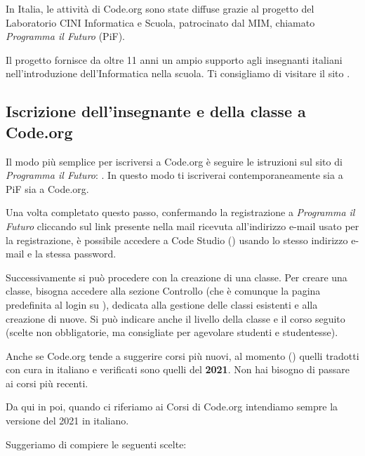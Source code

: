 In Italia, le attività di Code.org sono state diffuse grazie al progetto del Laboratorio CINI Informatica e Scuola, patrocinato dal MIM, chiamato \emph{Programma il Futuro} (PiF).

Il progetto fornisce da oltre 11 anni un ampio supporto agli insegnanti italiani nell'introduzione dell'Informatica nella scuola. Ti consigliamo di visitare il sito .

\subsection{Iscrizione dell'insegnante e della classe a Code.org }\label{iscrizione-dellinsegnante-e-della-classe-a-code.org}


Il modo più semplice per iscriversi a Code.org è seguire le istruzioni sul sito di \emph{Programma il Futuro}: . In questo modo ti iscriverai contemporaneamente sia a PiF sia a Code.org.


Una volta completato questo passo, confermando la registrazione a \emph{Programma il Futuro} cliccando sul link presente nella mail ricevuta all'indirizzo e-mail usato per la registrazione, è possibile accedere a Code Studio () usando lo stesso indirizzo e-mail e la stessa password.

Successivamente si può procedere con la creazione di una classe. Per creare una classe, bisogna accedere alla sezione Controllo (che è comunque la pagina predefinita al login su ), dedicata alla gestione delle classi esistenti e alla creazione di nuove. Si può indicare anche il livello della classe e il corso seguito (scelte non obbligatorie, ma consigliate per agevolare studenti e studentesse).

\begin{attenzione}
  Anche se Code.org tende a suggerire corsi più nuovi, al momento (\meseannocorrente) quelli tradotti con cura in italiano e verificati sono quelli del \textbf{2021}. Non hai bisogno di passare ai corsi più recenti.

  Da qui in poi, quando ci riferiamo ai Corsi di Code.org intendiamo sempre la versione del 2021 in italiano.
\end{attenzione}

Suggeriamo di compiere le seguenti scelte:


